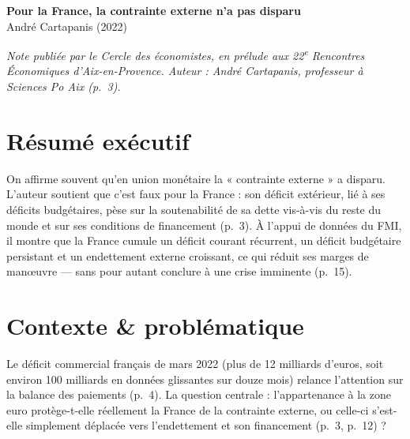 \documentclass[11pt,a4paper]{article}
\begin{document}
\begin{center}
  {\LARGE\bfseries\color{accent} Pour la France, la contrainte externe n'a pas disparu}\\[0.3em]
  {\large André Cartapanis (2022)}
\end{center}

\vspace{0.4em}
{\small\itshape Note publiée par le Cercle des économistes, en prélude aux 22\textsuperscript{e}
Rencontres Économiques d'Aix-en-Provence. Auteur : André Cartapanis, professeur à
Sciences Po Aix (p.~3).}

\section{Résumé exécutif}
On affirme souvent qu'en union monétaire la « contrainte externe » a disparu.
L'auteur soutient que c'est faux pour la France : son déficit extérieur, lié à ses
déficits budgétaires, pèse sur la soutenabilité de sa dette vis-à-vis du reste du
monde et sur ses conditions de financement (p.~3). À l'appui de données du FMI, il
montre que la France cumule un déficit courant récurrent, un déficit budgétaire
persistant et un endettement externe croissant, ce qui réduit ses marges de
manœuvre — sans pour autant conclure à une crise imminente (p.~15).

\section{Contexte \& problématique}
Le déficit commercial français de mars 2022 (plus de 12 milliards d'euros, soit
environ 100 milliards en données glissantes sur douze mois) relance l'attention sur
la balance des paiements (p.~4). La question centrale : l'appartenance à la zone
euro protège-t-elle réellement la France de la contrainte externe, ou celle-ci
s'est-elle simplement déplacée vers l'endettement et son financement (p.~3, p.~12) ?
\end{document}
